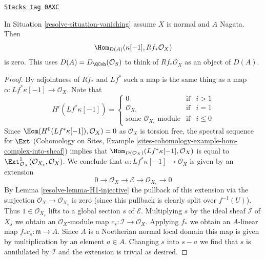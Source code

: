 \begin{lemma}[R1 injective]
\label{resolve-lemma-R1-injective}
\href{https://stacks.math.columbia.edu/tag/0AXC}{\texttt{Stacks tag 0AXC}}

In Situation \ref{resolve-situation-vanishing} assume $X$ is normal and $A$ Nagata.
Then
$$
\Hom_{D(A)}(\kappa[-1], Rf_*\mathcal{O}_X)
$$
is zero. This uses $D(A) = D_\QCoh(\mathcal{O}_S)$ to think of
$Rf_*\mathcal{O}_X$ as an object of $D(A)$.
\end{lemma}

\begin{proof}

By adjointness of $Rf_*$ and $Lf^*$ such a map is the same thing
as a map $\alpha : Lf^*\kappa[-1] \to \mathcal{O}_X$. Note that
$$
H^i(Lf^*\kappa[-1]) =
\left\{
\begin{matrix}
0 & \text{if} & i > 1 \\
\mathcal{O}_{X_s} & \text{if} & i = 1 \\
\text{some }\mathcal{O}_{X_s}\text{-module} & \text{if} & i \leq 0
\end{matrix}
\right.
$$
Since $\Hom(H^0(Lf^*\kappa[-1]), \mathcal{O}_X) = 0$ as $\mathcal{O}_X$
is torsion free, the spectral sequence for $\Ext$
(Cohomology on Sites, Example
\ref{sites-cohomology-example-hom-complex-into-sheaf})
implies that
$\Hom_{D(\mathcal{O}_X)}(Lf^*\kappa[-1], \mathcal{O}_X)$ is equal to
$\Ext^1_{\mathcal{O}_X}(\mathcal{O}_{X_s}, \mathcal{O}_X)$.
We conclude that
$\alpha : Lf^*\kappa[-1] \to \mathcal{O}_X$ is given by an extension
$$
0 \to \mathcal{O}_X \to \mathcal{E} \to \mathcal{O}_{X_s} \to 0
$$
By Lemma \ref{resolve-lemma-H1-injective} the pullback of this extension
via the surjection $\mathcal{O}_X \to \mathcal{O}_{X_s}$ is zero
(since this pullback is clearly split over $f^{-1}(U)$).
Thus $1 \in \mathcal{O}_{X_s}$ lifts to a global section $s$ of
$\mathcal{E}$. Multiplying $s$ by the ideal sheaf $\mathcal{I}$
of $X_s$ we obtain an $\mathcal{O}_X$-module map
$c_s : \mathcal{I} \to \mathcal{O}_X$. Applying $f_*$ we obtain
an $A$-linear map $f_*c_s : \mathfrak m \to A$. Since $A$ is
a Noetherian normal local domain this map is given by multiplication
by an element $a \in A$. Changing $s$ into $s -  a$ we find that
$s$ is annihilated by $\mathcal{I}$ and the extension is trivial
as desired.
\end{proof}


